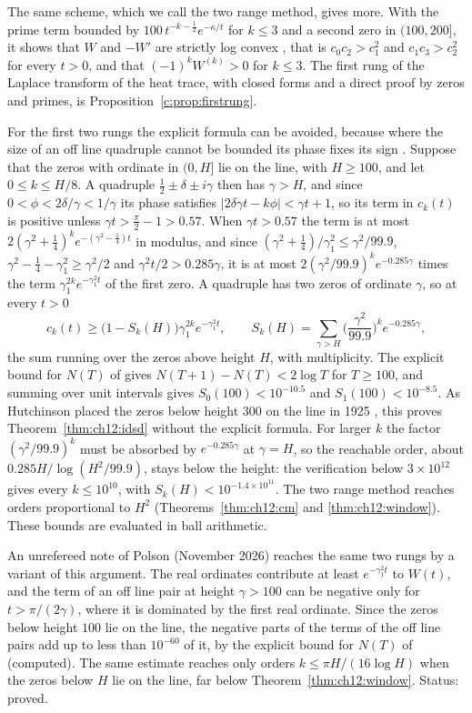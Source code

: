 The same scheme, which we call the two range method, gives more. With the prime term bounded by $100\,t^{-k-\frac12}e^{-\kappa/t}$ for $k\le3$ and a second zero in $(100,200]$, it shows that $W$ and $-W'$ are strictly log convex \cite[Theorem 7.3]{P17}, that is $c_0c_2>c_1^2$ and $c_1c_3>c_2^2$ for every $t>0$, and that $(-1)^kW^{(k)}>0$ for $k\le3$. The first rung of the Laplace transform of the heat trace, with closed forms and a direct proof by zeros and primes, is Proposition~\ref{c:prop:firstrung}.

For the first two rungs the explicit formula can be avoided, because where the size of an off line quadruple cannot be bounded its phase fixes its sign \cite{P26wig}. Suppose that the zeros with ordinate in $(0,H]$ lie on the line, with $H\ge100$, and let $0\le k\le H/8$. A quadruple $\frac12\pm\delta\pm i\gamma$ then has $\gamma>H$, and since $0<\phi<2\delta/\gamma<1/\gamma$ its phase satisfies $|2\delta\gamma t-k\phi|<\gamma t+1$, so its term in $c_k(t)$ is positive unless $\gamma t>\frac\pi2-1>0.57$. When $\gamma t>0.57$ the term is at most $2(\gamma^2+\frac14)^ke^{-(\gamma^2-\frac14)t}$ in modulus, and since $(\gamma^2+\frac14)/\gamma_1^2\le\gamma^2/99.9$, $\gamma^2-\frac14-\gamma_1^2\ge\gamma^2/2$ and $\gamma^2t/2>0.285\gamma$, it is at most $2(\gamma^2/99.9)^ke^{-0.285\gamma}$ times the term $\gamma_1^{2k}e^{-\gamma_1^2t}$ of the first zero. A quadruple has two zeros of ordinate $\gamma$, so at every $t>0$
\[
c_k(t)\ge\big(1-S_k(H)\big)\gamma_1^{2k}e^{-\gamma_1^2t},\qquad S_k(H)=\sum_{\gamma>H}\Big(\frac{\gamma^2}{99.9}\Big)^ke^{-0.285\gamma},
\]
the sum running over the zeros above height $H$, with multiplicity. The explicit bound for $N(T)$ of \cite{HSW22} gives $N(T+1)-N(T)<2\log T$ for $T\ge100$, and summing over unit intervals gives $S_0(100)<10^{-10.5}$ and $S_1(100)<10^{-8.5}$. As Hutchinson placed the zeros below height $300$ on the line in 1925 \cite{Hutchinson25}, this proves Theorem~\ref{thm:ch12:idsd} without the explicit formula. For larger $k$ the factor $(\gamma^2/99.9)^k$ must be absorbed by $e^{-0.285\gamma}$ at $\gamma=H$, so the reachable order, about $0.285H/\log(H^2/99.9)$, stays below the height: the verification below $3\times10^{12}$ \cite{PT21} gives every $k\le10^{10}$, with $S_k(H)<10^{-1.4\times10^{11}}$. The two range method reaches orders proportional to $H^2$ (Theorems~\ref{thm:ch12:cm} and \ref{thm:ch12:window}). These bounds are evaluated in ball arithmetic.

\begin{remark}An unrefereed note of Polson (November 2026) reaches the same two rungs by a variant of this argument. The real ordinates contribute at least $e^{-\gamma_1^2t}$ to $W(t)$, and the term of an off line pair at height $\gamma>100$ can be negative only for $t>\pi/(2\gamma)$, where it is dominated by the first real ordinate. Since the zeros below height $100$ lie on the line, the negative parts of the terms of the off line pairs add up to less than $10^{-60}$ of it, by the explicit bound for $N(T)$ of \cite{HSW22} (computed). The same estimate reaches only orders $k\le\pi H/(16\log H)$ when the zeros below $H$ lie on the line, far below Theorem~\ref{thm:ch12:window}. Status: proved.\end{remark}

